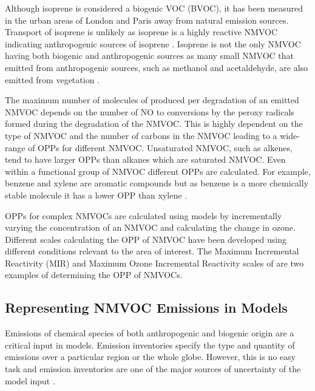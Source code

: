 Although isoprene is considered a biogenic VOC (BVOC), it has been measured in the urban areas of London and Paris away from natural emission sources.
Transport of isoprene is unlikely as isoprene is a highly reactive NMVOC indicating anthropogenic sources of isoprene \citep{vonSchneidemesser:2011}.
Isoprene is not the only NMVOC having both biogenic and anthropogenic sources as many small NMVOC that emitted from anthropogenic sources, such as methanol and acetaldehyde, are also emitted from vegetation \citep{Guenther:2012}.
%

The maximum number of molecules of  produced per degradation of an emitted NMVOC depends on the number of NO to  conversions by the peroxy radicals formed during the degradation of the NMVOC.
This is highly dependent on the type of NMVOC and the number of carbons in the NMVOC leading to a wide-range of OPPs for different NMVOC.
Unsaturated NMVOC, such as alkenes, tend to have larger OPPs than alkanes which are saturated NMVOC.
Even within a functional group of NMVOC different OPPs are calculated.
For example, benzene and xylene are aromatic compounds but as benzene is a more chemically stable molecule it has a lower OPP than xylene \citep{Carter:1994}.

OPPs for complex NMVOCs are calculated using models by incrementally varying the concentration of an NMVOC and calculating the change in ozone.
Different scales calculating the OPP of NMVOC have been developed using different  conditions relevant to the area of interest.
The Maximum Incremental Reactivity (MIR) and Maximum Ozone Incremental Reactivity scales of \citet{Carter:1994} are two examples of determining the OPP of NMVOCs.

\subsection{Representing NMVOC Emissions in Models}
Emissions of chemical species of both anthropogenic and biogenic origin are a critical input in models.
Emission inventories specify the type and quantity of emissions over a particular region or the whole globe.
However, this is no easy task and emission inventories are one of the major sources of uncertainty of the model input \citep{Russell:2000}.

